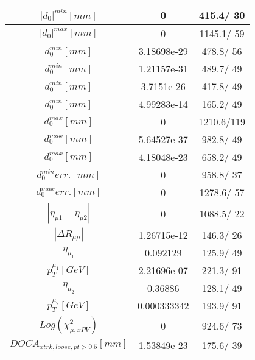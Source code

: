 \documentclass{article}
\begin{document}
\begin{table}[htbp]
\begin{center}
\begin{tabular}{c|c|c}
\hline
$|d_{0}|^{min} [mm]$ & 0 & 415.4/ 30\\
\hline
$|d_{0}|^{max} [mm]$ & 0 & 1145.1/ 59\\
\hline
$d_{0}^{min} [mm]$ & 3.18698e-29 & 478.8/ 56\\
\hline
$d_{0}^{min} [mm]$ & 1.21157e-31 & 489.7/ 49\\
\hline
$d_{0}^{min} [mm]$ & 3.7151e-26 & 417.8/ 49\\
\hline
$d_{0}^{min} [mm]$ & 4.99283e-14 & 165.2/ 49\\
\hline
$d_{0}^{max} [mm]$ & 0 & 1210.6/119\\
\hline
$d_{0}^{max} [mm]$ & 5.64527e-37 & 982.8/ 49\\
\hline
$d_{0}^{max} [mm]$ & 4.18048e-23 & 658.2/ 49\\
\hline
$d_{0}^{min} err. [mm]$ & 0 & 958.8/ 37\\
\hline
$d_{0}^{max} err. [mm]$ & 0 & 1278.6/ 57\\
\hline
$|\eta_{\mu1}-\eta_{\mu2}|$ & 0 & 1088.5/ 22\\
\hline
$|\Delta R_{\mu \mu}|$ & 1.26715e-12 & 146.3/ 26\\
\hline
$\eta_{\mu_{1}}$ & 0.092129 & 125.9/ 49\\
\hline
$p_{T}^{\mu_{1}} [GeV]$ & 2.21696e-07 & 221.3/ 91\\
\hline
$\eta_{\mu_{2}}$ & 0.36886 & 128.1/ 49\\
\hline
$p_{T}^{\mu_{2}} [GeV]$ & 0.000333342 & 193.9/ 91\\
\hline
$Log(\chi^{2}_{\mu,xPV})$ & 0 & 924.6/ 73\\
\hline
$DOCA_{xtrk, loose, pt>0.5} [mm]$ & 1.53849e-23 & 175.6/ 39\\
\hline
\end{tabular}
\end{center}
\end{table}
\end{document}
